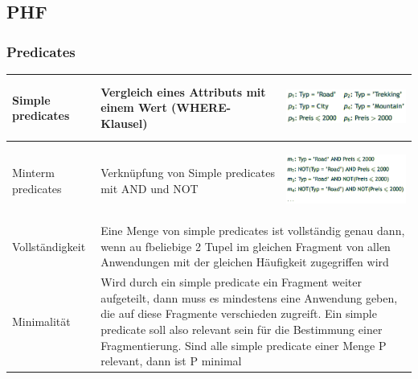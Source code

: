 \documentclass[a4paper,11pt]{article}
\begin{document}
\subsection{PHF}
\subsubsection{Predicates}
\begin{tabular}{| p{5cm} | p{5cm} | p{6cm} |}
\hline 
Simple predicates & Vergleich eines Attributs mit einem Wert (WHERE-Klausel) & \begin{center}\includegraphics[scale=0.5]{src/simple_predicates.png}\end{center}\\ \hline
Minterm predicates & Verknüpfung von Simple predicates mit AND und NOT & \begin{center}\includegraphics[scale=0.5]{src/minterm_predicates.png}\end{center}\\ \hline
Vollständigkeit & \multicolumn{2}{p{10cm}|}{Eine Menge von simple predicates ist vollständig genau dann, wenn au fbeliebige 2 Tupel im gleichen Fragment von allen Anwendungen mit der gleichen Häufigkeit zugegriffen wird}\\ \hline
Minimalität & \multicolumn{2}{p{10cm}|}{Wird durch ein simple predicate ein Fragment weiter aufgeteilt, dann muss es mindestens eine Anwendung geben, die auf diese Fragmente verschieden zugreift. Ein simple predicate soll also relevant sein für die Bestimmung einer Fragmentierung. Sind alle simple predicate einer Menge P relevant, dann ist P minimal}\\ \hline
\end{tabular}
\end{document}
